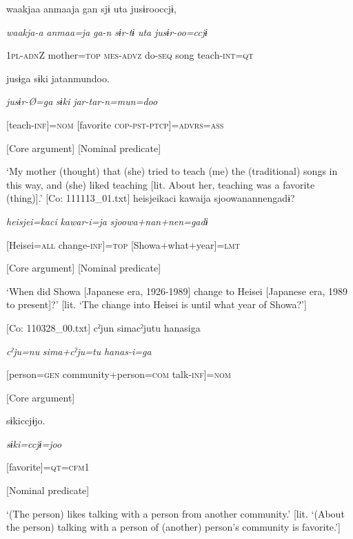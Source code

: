 \ea {\TM}
\glll  waakjaa  anmaaja  gan  sjɨ  uta  jusɨrooccjɨ,

      \textit{waakja-a}  \textit{anmaa=ja}  \textit{ga-n}  \textit{sɨr-tɨ}  \textit{uta}  \textit{jusɨr-oo=ccjɨ}

      1\textsc{pl}-\textsc{adn}Z  mother=\textsc{top}  \textsc{mes}-\textsc{advz}  do-\textsc{seq}  song  teach-\textsc{int}=\textsc{qt}

      jusɨga  sɨki  jatanmundoo.

      \textit{jusɨr-Ø=ga}  \textit{sɨki}  \textit{jar-tar-n=mun=doo}

      [teach-\textsc{inf}]=\textsc{nom}  [favorite  \textsc{cop}-\textsc{pst}-\textsc{ptcp}]=\textsc{advrs}=\textsc{ass}

      [Core argument]  [Nominal predicate]

\glt ‘My mother (thought) that (she) tried to teach (me) the (traditional) songs in this way, and (she) liked teaching [lit. About her, teaching was a favorite (thing)].’ [Co: 111113\_01.txt]
\ex {\TM}
\glll  heisjeikaci  kawaija  {\textbar}sjoowanannen{\textbar}gadɨ?

      \textit{heisjei=kaci}  \textit{kawar-i=ja}  \textit{sjoowa+nan+nen=gadɨ}

      [Heisei=\textsc{all}  change-\textsc{inf}]=\textsc{top}  [Showa+what+year]=\textsc{lmt}

      [Core argument]  [Nominal predicate]

\glt ‘When did Showa [Japanese era, 1926-1989] change to Heisei [Japanese era, 1989 to present]?’ [lit. ‘The change into Heisei is until what year of Showa?’]

      [Co: 110328\_00.txt]
\ex {\TM}
\glll  cˀjun  simacˀjutu  hanasiga

      \textit{cˀju=nu}  \textit{sima+cˀju=tu}  \textit{hanas-i=ga}

      [person=\textsc{gen}  community+person=\textsc{com}  talk-\textsc{inf}]=\textsc{nom}

      [Core argument]  

      sɨkiccjɨjo.

      \textit{sɨki=ccjɨ=joo}

      [favorite]=\textsc{qt}=\textsc{cfm1}

      [Nominal predicate]

\glt ‘(The person) likes talking with a person from another community.’ [lit. ‘(About the person) talking with a person of (another) person’s community is favorite.’]

